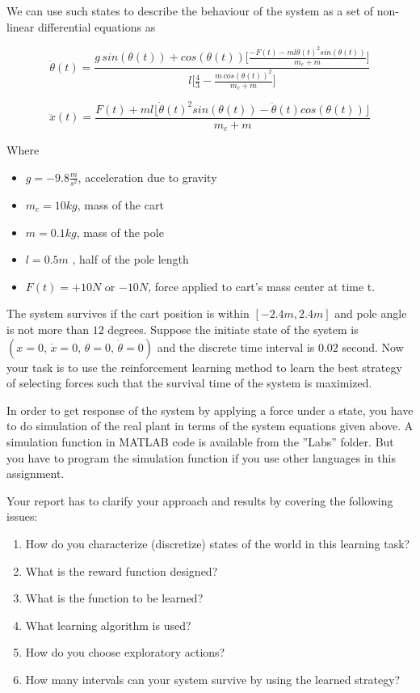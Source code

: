 \documentclass[12pt,a4paper]{article}
\makeatletter
\newcommand\mynobreakpar{\par\nobreak\@afterheading}
\makeatother
\begin{document}
\noindent
We can use such states to describe the behaviour of the system as a set of non-linear
differential equations as

$$
\ddot{\theta}(t) = \frac{ g\,sin(\theta(t)) + cos(\theta(t))\Big[\frac{-F(t)-ml\dot{\theta}(t)^2sin(\theta(t))}{m_c + m}\Big]}
                        {l\Big[\frac{4}{3} - \frac{m\,cos(\theta(t))^2}{m_c + m}\Big]}
$$

$$
\ddot{x}(t) = \frac{F(t) + ml \lfloor \dot\theta(t)^2 sin(\theta(t)) - \ddot{\theta}(t) cos(\theta(t))\rfloor}
                   {m_c + m}
$$

\noindent
Where\mynobreakpar
\begin{itemize}

	\item[] $g = -9.8 \frac{m}{s^2}$, acceleration due to gravity
	\item[] $m_c = 10 kg$, mass of the cart
	\item[] $m = 0.1 kg$, mass of the pole
	\item[] $l = 0.5 m$ , half of the pole length
	\item[] $F(t) = +10 N$ or $-10 N$, force applied to cart’s mass center at time t.

\end{itemize}

The system survives if the cart position is within $[-2.4 m, 2.4 m]$ and pole angle is not more
than $12$ degrees. Suppose the initiate state of the system is $(x=0,\, \dot x=0,\, \theta=0,\, \dot \theta=0)$ and the 
discrete time interval is $0.02$ second. Now your task is to use the reinforcement learning
method to learn the best strategy of selecting forces such that the survival time of the system
is maximized.


In order to get response of the system by applying a force under a state, you have to do
simulation of the real plant in terms of the system equations given above. A simulation
function in MATLAB code is available from the ''Labs'' folder. But you have to program the
simulation function if you use other languages in this assignment.


Your report has to clarify your approach and results by covering the following issues:

\begin{enumerate}

	\item How do you characterize (discretize) states of the world in this learning task?
	\item What is the reward function designed?
	\item What is the function to be learned?
	\item What learning algorithm is used?
	\item How do you choose exploratory actions?
	\item How many intervals can your system survive by using the learned strategy?

\end{enumerate}
\end{document}
